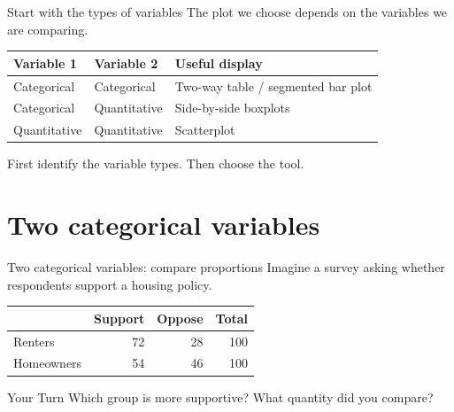 \documentclass[11pt,aspectratio=169]{beamer}
\newcommand{\yourturn}[1]{%
\begin{center}
\begin{minipage}{0.88\textwidth}
\begin{alertblock}{Your Turn}
#1
\end{alertblock}
\end{minipage}
\end{center}}
\begin{document}
\begin{frame}{Start with the types of variables}
The plot we choose depends on the variables we are comparing.

\vspace{0.5em}
\begin{center}
\renewcommand{\arraystretch}{1.35}
\begin{tabular}{lll}
\toprule
\textbf{Variable 1} & \textbf{Variable 2} & \textbf{Useful display} \\
\midrule
Categorical & Categorical & Two-way table / segmented bar plot \\
Categorical & Quantitative & Side-by-side boxplots \\
Quantitative & Quantitative & Scatterplot \\
\bottomrule
\end{tabular}
\end{center}

\vspace{0.7em}
\alert{First identify the variable types. Then choose the tool.}
\end{frame}

\section{Two categorical variables}

\begin{frame}{Two categorical variables: compare proportions}
Imagine a survey asking whether respondents support a housing policy.

\begin{center}
\renewcommand{\arraystretch}{1.25}
\begin{tabular}{lrrr}
\toprule
 & Support & Oppose & Total \\
\midrule
Renters & 72 & 28 & 100 \\
Homeowners & 54 & 46 & 100 \\
\bottomrule
\end{tabular}
\end{center}

\yourturn{Which group is more supportive? What quantity did you compare?}
\end{frame}
\end{document}
